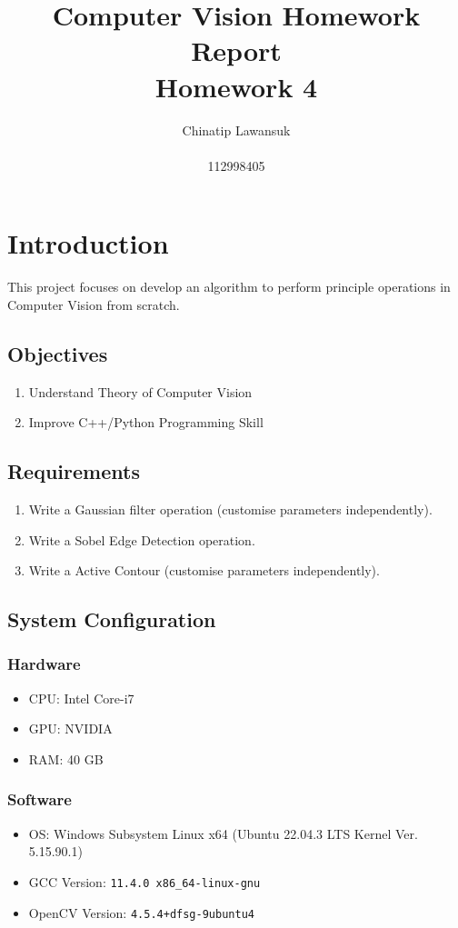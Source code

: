\documentclass[12pt,a4paper]{report}
\title{Computer Vision Homework Report \\ \Large Homework 4}
\author{Chinatip Lawansuk\\\\112998405}
\date{}
\begin{document}
\maketitle

\tableofcontents

\chapter{Introduction}
This project focuses on develop an algorithm to perform principle operations in Computer Vision from scratch.

\section{Objectives}
\begin{enumerate}
    \item Understand Theory of Computer Vision
    \item Improve C++/Python Programming Skill
\end{enumerate}

\section{Requirements}
\begin{enumerate}
    \item Write a Gaussian filter operation (customise parameters independently).
    \item Write a Sobel Edge Detection operation.
    \item Write a Active Contour (customise parameters independently).
\end{enumerate}

\section{System Configuration}
\subsection{Hardware}
\begin{itemize}
    \item CPU\@: Intel Core-i7
    \item GPU\@: NVIDIA
    \item RAM\@: 40 GB
\end{itemize}

\subsection{Software}
\begin{itemize}
    \item OS\@: Windows Subsystem Linux x64 (Ubuntu 22.04.3 LTS Kernel Ver. 5.15.90.1)
    \item GCC Version\@: \verb|11.4.0 x86_64-linux-gnu|
    \item OpenCV Version\@: \verb|4.5.4+dfsg-9ubuntu4|
\end{itemize}
\end{document}
